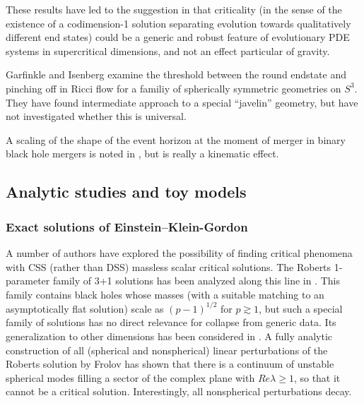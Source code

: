\documentclass{article}
\begin{document}
These results have led to the suggestion in \cite{BizonTabor} that
criticality (in the sense of the existence of a codimension-1 solution
separating evolution towards qualitatively different end states) could
be a generic and robust feature of evolutionary PDE systems in
supercritical dimensions, and not an effect particular of gravity.

Garfinkle and Isenberg \cite{GarfinkleIsenberg} examine the threshold
between the round endstate and pinching off in Ricci flow for a familiy
of spherically symmetric geometries on $S^3$. They have found
intermediate approach to a special ``javelin'' geometry, but have
not investigated whether this is universal.

A scaling of the shape of the event horizon at the
moment of merger in binary black hole mergers is noted in
\cite{Caveny}, but is really a kinematic effect.


\subsection{Analytic studies and toy models}


\subsubsection{Exact solutions of Einstein--Klein-Gordon}

A number of authors have explored the possibility of finding critical
phenomena with CSS (rather than DSS) massless scalar critical solutions.
The Roberts 1-parameter family of 3+1 solutions \cite{Roberts}
has been analyzed along this line in
\cite{Oshiro_Roberts, Brady_Roberts, WangOliveira, Kiem}. This family
contains black holes whose masses (with a suitable matching to an
asymptotically flat solution) scale as $(p-1)^{1/2}$ for $p\gtrsim 1$,
but such a special family of solutions
has no direct relevance for collapse from generic data.
Its generalization to other dimensions has been considered in
\cite{Frolov2}.
A fully analytic construction of all (spherical and nonspherical) linear
perturbations of the Roberts solution by Frolov \cite{Frolov, Frolov3}
has shown that there is a continuum of unstable spherical modes
filling a sector of the complex plane with $Re\lambda\ge 1$, so that
it cannot be a critical solution. Interestingly, all nonspherical
perturbations decay. 
\end{document}
